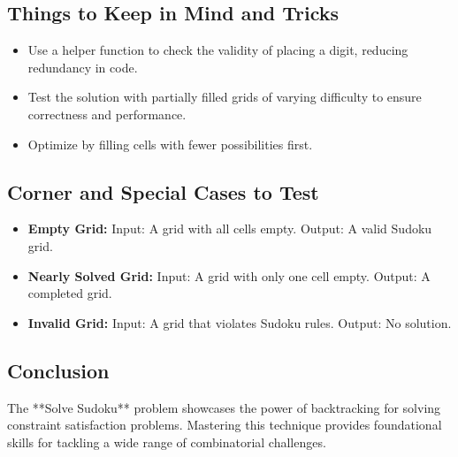 \subsection*{Things to Keep in Mind and Tricks}
\begin{itemize}
    \item Use a helper function to check the validity of placing a digit, reducing redundancy in code.
    \item Test the solution with partially filled grids of varying difficulty to ensure correctness and performance.
    \item Optimize by filling cells with fewer possibilities first.
\end{itemize}

\subsection*{Corner and Special Cases to Test}
\begin{itemize}
    \item \textbf{Empty Grid:} Input: A grid with all cells empty. Output: A valid Sudoku grid.
    \item \textbf{Nearly Solved Grid:} Input: A grid with only one cell empty. Output: A completed grid.
    \item \textbf{Invalid Grid:} Input: A grid that violates Sudoku rules. Output: No solution.
\end{itemize}

\subsection*{Conclusion}
The **Solve Sudoku** problem showcases the power of backtracking for solving constraint satisfaction problems. Mastering this technique provides foundational skills for tackling a wide range of combinatorial challenges.